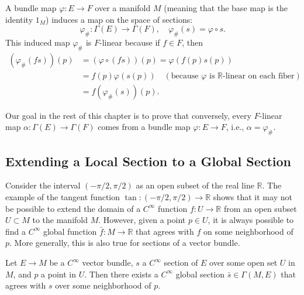 \begin{example}
\begin{definition}
A bundle map $\varphi : E \to F$ over a manifold $M$ (meaning that the base map is the identity $1_M$) induces a map on the space of sections:
\[
\varphi_\# : \Gamma(E) \to \Gamma(F), \quad \varphi_\#(s) = \varphi \circ s.
\]
This induced map $\varphi_\#$ is $F$-linear because if $f \in F$, then
\begin{align*}
(\varphi_\#(fs))(p) &= (\varphi \circ (fs))(p) = \varphi(f(p)s(p)) \\
&= f(p)\varphi(s(p)) \quad (\text{because } \varphi \text{ is } \mathbb{R}\text{-linear on each fiber}) \\
&= f(\varphi_\#(s))(p).
\end{align*}
\end{definition}

Our goal in the rest of this chapter is to prove that conversely, every $F$-linear map $\alpha : \Gamma(E) \to \Gamma(F)$ comes from a bundle map $\varphi : E \to F$, i.e., $\alpha = \varphi_\#$.

\subsection{Extending a Local Section to a Global Section}

Consider the interval $(-\pi/2, \pi/2)$ as an open subset of the real line $\mathbb{R}$. The example of the tangent function $\tan : (-\pi/2, \pi/2) \to \mathbb{R}$ shows that it may not be possible to extend the domain of a $C^{\infty}$ function $f : U \to \mathbb{R}$ from an open subset $U \subset M$ to the manifold $M$. However, given a point $p \in U$, it is always possible to find a $C^{\infty}$ global function $\bar{f} : M \to \mathbb{R}$ that agrees with $f$ on some neighborhood of $p$. More generally, this is also true for sections of a vector bundle.

\begin{proposition}
Let $E \to M$ be a $C^{\infty}$ vector bundle, $s$ a $C^{\infty}$ section of $E$ over some open set $U$ in $M$, and $p$ a point in $U$. Then there exists a $C^{\infty}$ global section $\bar{s} \in \Gamma(M,E)$ that agrees with $s$ over some neighborhood of $p$.
\end{proposition}


\end{example}
